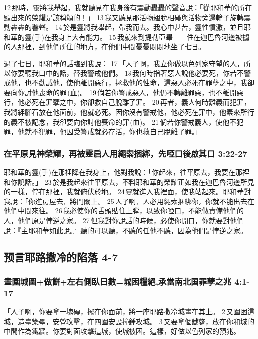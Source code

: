 12 那時，靈將我舉起，我就聽見在我身後有震動轟轟的聲音說：「從耶和華的所在顯出來的榮耀是該稱頌的！」 13 我又聽見那活物翅膀相碰與活物旁邊輪子旋轉震動轟轟的響聲。 14 於是靈將我舉起，帶我而去。我心中甚苦，靈性憤激，並且耶和華的靈(手)在我身上大有能力。 15 我就來到提勒亞畢——住在迦巴魯河邊被擄的人那裡，到他們所住的地方，在他們中間憂憂悶悶地坐了七日。

過了七日，耶和華的話臨到我說： 17 「人子啊，我立你做以色列家守望的人，所以你要聽我口中的話，替我警戒他們。 18 我何時指著惡人說他必要死，你若不警戒他，也不勸誡他，使他離開惡行，拯救他的性命，這惡人必死在罪孽之中，我卻要向你討他喪命的罪 (血)。 19 倘若你警戒惡人，他仍不轉離罪惡，也不離開惡行，他必死在罪孽之中，你卻救自己脫離了罪。 20 再者，義人何時離義而犯罪，我將絆腳石放在他面前，他就必死。因你沒有警戒他，他必死在罪中，他素來所行的義不被記念，我卻要向你討他喪命的罪 (血)。 21 倘若你警戒義人，使他不犯罪，他就不犯罪，他因受警戒就必存活，你也救自己脫離了罪。」

\subsubsection{在平原見神榮耀，再被靈启人用繩索捆綁，先啞口後啟其口 3:22-27}
耶和華的靈(手)在那裡降在我身上，他對我說：「你起來，往平原去，我要在那裡和你說話。」 23 於是我起來往平原去，不料耶和華的榮耀正如我在迦巴魯河邊所見的一樣，停在那裡，我就俯伏於地。 24 靈就進入我裡面，使我站起來。耶和華對我說：「你進房屋去，將門關上。 25 人子啊，人必用繩索捆綁你，你就不能出去在他們中間來往。 26 我必使你的舌頭貼住上膛，以致你啞口，不能做責備他們的人，他們原是悖逆之家。 27 但我對你說話的時候，必使你開口，你就要對他們說：『主耶和華如此說。』聽的可以聽，不聽的任他不聽，因為他們是悖逆之家。

\subsection{预言耶路撒冷的陷落 4-7}
\subsubsection{畫圍城圖+做餅+左右側臥日數=城困糧絕,承當南北国罪孽之兆 4:1-17}
「人子啊，你要拿一塊磚，擺在你面前，將一座耶路撒冷城畫在其上。 2 又圍困這城，造臺築壘，安營攻擊，在四圍安設撞錘攻城。 3 又要拿個鐵鏊，放在你和城的中間作為鐵牆。你要對面攻擊這城，使城被困。這樣，好做以色列家的預兆。

